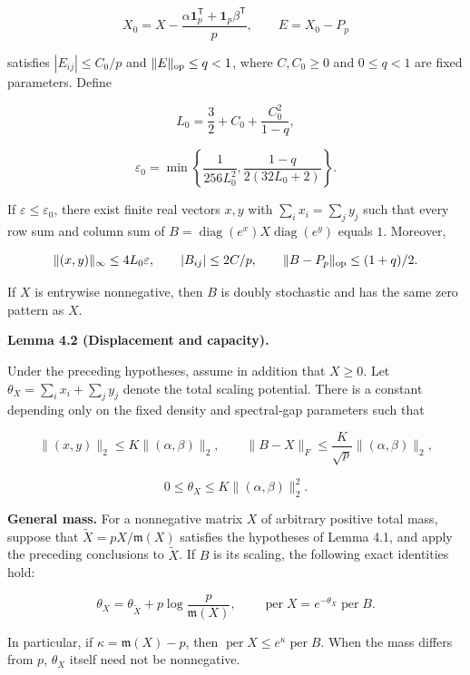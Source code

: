 \documentclass[11pt,a4paper]{article}
\begin{document}
\[
X_0=X-\frac{\alpha\mathbf 1_p^{\mathsf T}+\mathbf 1_p\beta^{\mathsf T}}p,\qquad E=X_0-P_p
\]

satisfies \(|E_{ij}|\le C_0/p\) and \(\|E\|_{\rm op}\le q<1\), where \(C,C_0\ge0\) and \(0\le q<1\) are fixed parameters. Define

\[
L_0=\frac32+C_0+\frac{C_0^2}{1-q},
\]

\[
\varepsilon_0=\min\left\{\frac1{256L_0^2},\frac{1-q}{2(32L_0+2)}\right\}.
\]

If \(\varepsilon\le\varepsilon_0\), there exist finite real vectors \(x,y\) with \(\sum_i x_i=\sum_j y_j\) such that every row sum and column sum of \(B=\operatorname{diag}(e^x)X\operatorname{diag}(e^y)\) equals \(1\). Moreover,

\[
\|(x,y)\|_\infty\le4L_0\varepsilon,\qquad |B_{ij}|\le2C/p,\qquad \|B-P_p\|_{\rm op}\le(1+q)/2.
\]

If \(X\) is entrywise nonnegative, then \(B\) is doubly stochastic and has the same zero pattern as \(X\).

\textbf{Lemma 4.2 (Displacement and capacity).}

Under the preceding hypotheses, assume in addition that \(X\ge0\). Let \(\theta_X=\sum_i x_i+\sum_j y_j\) denote the total scaling potential. There is a constant depending only on the fixed density and spectral-gap parameters such that

\[
\|(x,y)\|_2\le K\|(\alpha,\beta)\|_2,\qquad \|B-X\|_F\le\frac K{\sqrt p}\|(\alpha,\beta)\|_2,
\]

\[
0\le\theta_X\le K\|(\alpha,\beta)\|_2^2.
\]

\textbf{General mass.} For a nonnegative matrix \(X\) of arbitrary positive total mass, suppose that \(\widetilde X=pX/\mathfrak m(X)\) satisfies the hypotheses of Lemma 4.1, and apply the preceding conclusions to \(\widetilde X\). If \(B\) is its scaling, the following exact identities hold:

\[
\theta_X=\theta_{\widetilde X}+p\log\frac p{\mathfrak m(X)},\qquad \operatorname{per}X=e^{-\theta_X}\operatorname{per}B.
\]

In particular, if \(\kappa=\mathfrak m(X)-p\), then \(\operatorname{per}X\le e^\kappa\operatorname{per}B\). When the mass differs from \(p\), \(\theta_X\) itself need not be nonnegative.
\end{document}
